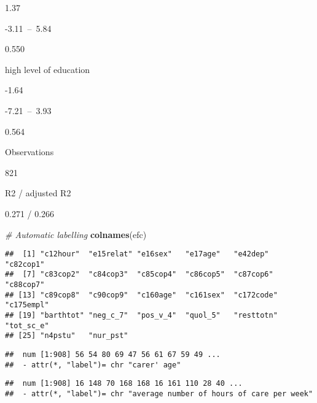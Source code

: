 \documentclass[]{article}
\newenvironment{Shaded}{\begin{snugshade}}{\end{snugshade}}
\newcommand{\KeywordTok}[1]{\textcolor[rgb]{0.13,0.29,0.53}{\textbf{#1}}}
\newcommand{\CommentTok}[1]{\textcolor[rgb]{0.56,0.35,0.01}{\textit{#1}}}
\newcommand{\OperatorTok}[1]{\textcolor[rgb]{0.81,0.36,0.00}{\textbf{#1}}}
\newcommand{\NormalTok}[1]{#1}
\begin{document}
1.37

-3.11~--~5.84

0.550

high level of education

-1.64

-7.21~--~3.93

0.564

Observations

821

R2 / adjusted R2

0.271 / 0.266

\begin{Shaded}
\begin{Highlighting}[]
\CommentTok{# Automatic labelling}
\KeywordTok{colnames}\NormalTok{(efc)}
\end{Highlighting}
\end{Shaded}

\begin{verbatim}
##  [1] "c12hour"  "e15relat" "e16sex"   "e17age"   "e42dep"   "c82cop1" 
##  [7] "c83cop2"  "c84cop3"  "c85cop4"  "c86cop5"  "c87cop6"  "c88cop7" 
## [13] "c89cop8"  "c90cop9"  "c160age"  "c161sex"  "c172code" "c175empl"
## [19] "barthtot" "neg_c_7"  "pos_v_4"  "quol_5"   "resttotn" "tot_sc_e"
## [25] "n4pstu"   "nur_pst"
\end{verbatim}

\begin{Shaded}
\end{Shaded}

\begin{verbatim}
##  num [1:908] 56 54 80 69 47 56 61 67 59 49 ...
##  - attr(*, "label")= chr "carer' age"
\end{verbatim}

\begin{Shaded}
\end{Shaded}

\begin{verbatim}
##  num [1:908] 16 148 70 168 168 16 161 110 28 40 ...
##  - attr(*, "label")= chr "average number of hours of care per week"
\end{verbatim}
\end{document}
